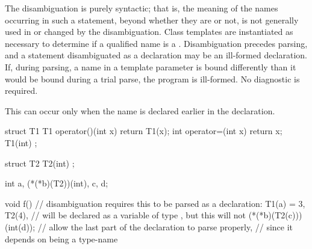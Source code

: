 \pnum
The disambiguation is purely syntactic; that is, the meaning of the
names occurring in such a statement, beyond whether they are
 or not, is not generally used in or changed by the
disambiguation. Class templates are instantiated as necessary to
determine if a qualified name is a . Disambiguation
precedes parsing, and a statement disambiguated as a declaration may be
an ill-formed declaration. If, during parsing, a name in a template
parameter is bound differently than it would be bound during a trial
parse, the program is ill-formed. No diagnostic is required.
\begin{note}
This can occur only when the name is declared earlier in the
declaration.
\end{note}
\begin{example}

\begin{codeblock}
struct T1 {
  T1 operator()(int x) { return T1(x); }
  int operator=(int x) { return x; }
  T1(int) { }
};

struct T2 { T2(int){ } };

int a, (*(*b)(T2))(int), c, d;

void f() {
  // disambiguation requires this to be parsed as a declaration:
  T1(a) = 3,
  T2(4),                        //  will be declared as a variable of type , but this will not
  (*(*b)(T2(c)))(int(d));       // allow the last part of the declaration to parse properly,
                                // since it depends on  being a type-name
}
\end{codeblock}
\end{example}%
